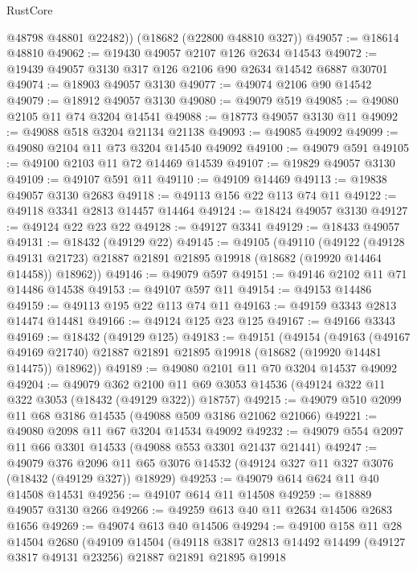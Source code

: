\begin{lexlean}{RustCore}
\begin{coremodule}
        @48798
        @48801
        @22482))
    (@18682 (@22800 @48810 @327))
@49057 := @18614 @48810
@49062 := @19430 @49057 @2107 @126 @2634 @14543
@49072 := @19439 @49057 @3130 @317 @126 @2106 @90 @2634 @14542 @6887 @30701
@49074 := @18903 @49057 @3130
@49077 := @49074 @2106 @90 @14542
@49079 := @18912 @49057 @3130
@49080 := @49079 @519
@49085 := @49080 @2105 @11 @74 @3204 @14541
@49088 := @18773 @49057 @3130 @11
@49092 := @49088 @518 @3204 @21134 @21138
@49093 := @49085 @49092
@49099 := @49080 @2104 @11 @73 @3204 @14540 @49092
@49100 := @49079 @591
@49105 := @49100 @2103 @11 @72 @14469 @14539
@49107 := @19829 @49057 @3130
@49109 := @49107 @591 @11
@49110 := @49109 @14469
@49113 := @19838 @49057 @3130 @2683
@49118 := @49113 @156 @22 @113 @74 @11
@49122 := @49118 @3341 @2813 @14457 @14464
@49124 := @18424 @49057 @3130
@49127 := @49124 @22 @23 @22
@49128 := @49127 @3341
@49129 := @18433 @49057
@49131 := @18432 (@49129 @22)
@49145 := @49105
    (@49110
      (@49122
        (@49128 @49131 @21723)
        @21887
        @21891
        @21895
        @19918
        (@18682 (@19920 @14464 @14458))
        @18962))
@49146 := @49079 @597
@49151 := @49146 @2102 @11 @71 @14486 @14538
@49153 := @49107 @597 @11
@49154 := @49153 @14486
@49159 := @49113 @195 @22 @113 @74 @11
@49163 := @49159 @3343 @2813 @14474 @14481
@49166 := @49124 @125 @23 @125
@49167 := @49166 @3343
@49169 := @18432 (@49129 @125)
@49183 := @49151
    (@49154
      (@49163
        (@49167 @49169 @21740)
        @21887
        @21891
        @21895
        @19918
        (@18682 (@19920 @14481 @14475))
        @18962))
@49189 := @49080 @2101 @11 @70 @3204 @14537 @49092
@49204 := @49079
    @362
    @2100
    @11
    @69
    @3053
    @14536
    (@49124 @322 @11 @322 @3053 (@18432 (@49129 @322)) @18757)
@49215 := @49079 @510 @2099 @11 @68 @3186 @14535 (@49088 @509 @3186 @21062 @21066)
@49221 := @49080 @2098 @11 @67 @3204 @14534 @49092
@49232 := @49079 @554 @2097 @11 @66 @3301 @14533 (@49088 @553 @3301 @21437 @21441)
@49247 := @49079
    @376
    @2096
    @11
    @65
    @3076
    @14532
    (@49124 @327 @11 @327 @3076 (@18432 (@49129 @327)) @18929)
@49253 := @49079 @614 @624 @11 @40 @14508 @14531
@49256 := @49107 @614 @11 @14508
@49259 := @18889 @49057 @3130 @266
@49266 := @49259 @613 @40 @11 @2634 @14506 @2683 @1656
@49269 := @49074 @613 @40 @14506
@49294 := @49100
    @158
    @11
    @28
    @14504
    @2680
    (@49109
      @14504
      (@49118
        @3817
        @2813
        @14492
        @14499
        (@49127 @3817 @49131 @23256)
        @21887
        @21891
        @21895
        @19918

\end{coremodule}
\end{lexlean}
